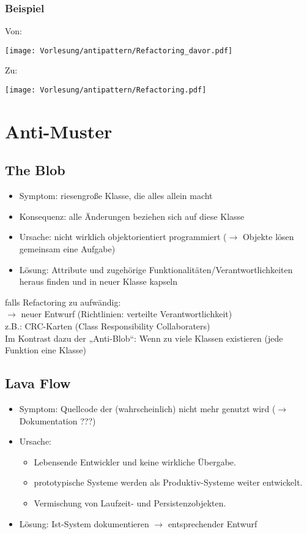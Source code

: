 \subsubsection*{Beispiel}
Von:
\begin{center}
\texttt{[image: Vorlesung/antipattern/Refactoring\_davor.pdf]}
\end{center}
Zu:
\begin{center}
\texttt{[image: Vorlesung/antipattern/Refactoring.pdf]}
\end{center}

\section{Anti-Muster}

\subsection{The Blob}
\begin{itemize}
\item Symptom: riesengroße Klasse, die alles allein macht
\item Konsequenz: alle Änderungen beziehen sich auf diese Klasse
\item Ursache: nicht wirklich objektorientiert programmiert ($\to$ Objekte lösen gemeinsam eine Aufgabe)
\item Lösung: Attribute und zugehörige Funktionalitäten/Verantwortlichkeiten heraus finden und in neuer Klasse kapseln
\end{itemize}
falls Refactoring zu aufwändig:\\
$\to$ neuer Entwurf (Richtlinien: verteilte Verantwortlichkeit)\\
z.B.: CRC-Karten (Class Responsibility Collaboraters)\\
Im Kontrast dazu der „Anti-Blob“: Wenn zu viele Klassen existieren (jede Funktion eine Klasse)

\subsection{Lava Flow}
\begin{itemize}
\item Symptom: Quellcode der (wahrscheinlich) nicht mehr genutzt wird ($\to$ Dokumentation ???)
\item Ursache: 
\begin{itemize}
\item Lebensende Entwickler und keine wirkliche Übergabe.
\item prototypische Systeme werden als Produktiv-Systeme weiter entwickelt.
\item Vermischung von Laufzeit- und Persistenzobjekten.
\end{itemize}
\item Lösung: Ist-System dokumentieren $\to$ entsprechender Entwurf
\end{itemize}


